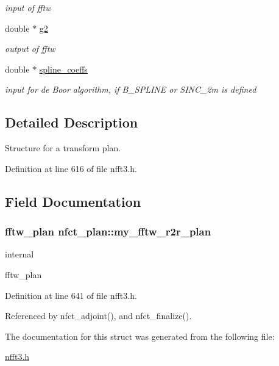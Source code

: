 \begin{CompactItemize}
\begin{CompactList}\small\item\em input of fftw \item\end{CompactList}\item 
\hypertarget{structnfct__plan_c4c375e593da728a4e7477f76ff12031}{
double $\ast$ \hyperlink{structnfct__plan_c4c375e593da728a4e7477f76ff12031}{g2}}
\label{structnfct__plan_c4c375e593da728a4e7477f76ff12031}

\begin{CompactList}\small\item\em output of fftw \item\end{CompactList}\item 
\hypertarget{structnfct__plan_53242b3a71b8997bdcd173777146c427}{
double $\ast$ \hyperlink{structnfct__plan_53242b3a71b8997bdcd173777146c427}{spline\_\-coeffs}}
\label{structnfct__plan_53242b3a71b8997bdcd173777146c427}

\begin{CompactList}\small\item\em input for de Boor algorithm, if B\_\-SPLINE or SINC\_\-2m is defined \item\end{CompactList}\end{CompactItemize}


\subsection{Detailed Description}
Structure for a transform plan. 

Definition at line 616 of file nfft3.h.

\subsection{Field Documentation}
\hypertarget{structnfct__plan_ef8278033ffe571d2bf7193be013929d}{
\subsubsection{\setlength{\rightskip}{0pt plus 5cm}fftw\_\-plan {\bf nfct\_\-plan::my\_\-fftw\_\-r2r\_\-plan}}}
\label{structnfct__plan_ef8278033ffe571d2bf7193be013929d}


internal 

fftw\_\-plan 

Definition at line 641 of file nfft3.h.

Referenced by nfct\_\-adjoint(), and nfct\_\-finalize().

The documentation for this struct was generated from the following file:\begin{CompactItemize}
\item 
\hyperlink{nfft3_8h}{nfft3.h}\end{CompactItemize}
